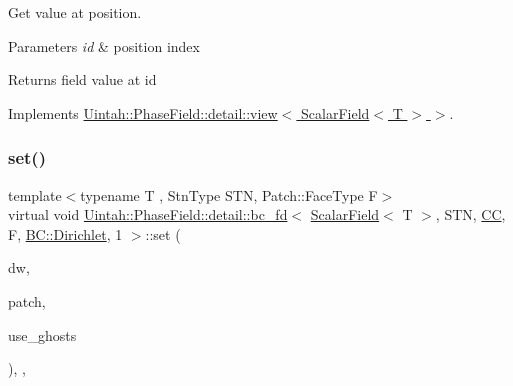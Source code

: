 Get value at position. 


\begin{DoxyParams}{Parameters}
{\em id} & position index \\
\hline
\end{DoxyParams}
\begin{DoxyReturn}{Returns}
field value at id 
\end{DoxyReturn}


Implements \hyperlink{classUintah_1_1PhaseField_1_1detail_1_1view_3_01ScalarField_3_01T_01_4_01_4_aea43cfedfe3b6f3c038ff795caec49b8}{Uintah\+::\+Phase\+Field\+::detail\+::view$<$ Scalar\+Field$<$ T $>$ $>$}.

\mbox{\label{classUintah_1_1PhaseField_1_1detail_1_1bc__fd_3_01ScalarField_3_01T_01_4_00_01STN_00_01CC_00_01Fa77b2fd7fb77d0a4dc6c86c68d4ea0bc_a871bf41d80de5acd4151631818963802}} 
\subsubsection{\texorpdfstring{set()}{set()}\hspace{0.1cm}{\footnotesize\ttfamily [1/2]}}
{\footnotesize\ttfamily template$<$typename T , Stn\+Type S\+TN, Patch\+::\+Face\+Type F$>$ \\
virtual void \hyperlink{classUintah_1_1PhaseField_1_1detail_1_1bc__fd}{Uintah\+::\+Phase\+Field\+::detail\+::bc\+\_\+fd}$<$ \hyperlink{structUintah_1_1PhaseField_1_1ScalarField}{Scalar\+Field}$<$ T $>$, S\+TN, \hyperlink{namespaceUintah_1_1PhaseField_a33d355affda78a83f45755ba8388cedda22303704507d024d1d6508ed9859a85a}{CC}, F, \hyperlink{namespaceUintah_1_1PhaseField_a148fba372aa3be96fd6eede7a2fa10b5abac152b762896edff34ed668ae1a546f}{B\+C\+::\+Dirichlet}, 1 $>$\+::set (\begin{DoxyParamCaption}\item[{Data\+Warehouse $\ast$}]{dw,  }\item[{const Patch $\ast$}]{patch,  }\item[{bool}]{use\+\_\+ghosts }\end{DoxyParamCaption})\hspace{0.3cm}{\ttfamily [inline]}, {\ttfamily [override]}, {\ttfamily [virtual]}}



